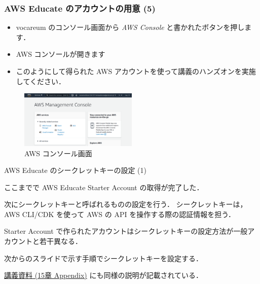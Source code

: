 \documentclass[unicode,11pt]{beamer}
\begin{document}
\begin{frame}
\frametitle{AWS Educate のアカウントの用意 (5)}

\begin{itemize}
    \item vocareum のコンソール画面から \emph{AWS Console} と書かれたボタンを押します．
    \item AWS コンソールが開きます
    \item このようにして得られた AWS アカウントを使って講義のハンズオンを実施してください．
\end{itemize}

\begin{figure}
    \centering
    \includegraphics[width=0.5\textwidth]{imgs/aws_console_screenshot.png}
    \caption{AWS コンソール画面}
\end{figure}

\end{frame}

\begin{frame}{AWS Educate のシークレットキーの設定 (1)}

ここまでで AWS Educate Starter Account の取得が完了した．

次にシークレットキーと呼ばれるものの設定を行う．
シークレットキーは， AWS CLI/CDK を使って AWS の API を操作する際の認証情報を担う．

Starter Account で作られたアカウントはシークレットキーの設定方法が一般アカウントと若干異なる．

次からのスライドで示す手順でシークレットキーを設定する．

\href{https://tomomano.github.io/learn-aws-by-coding/}{講義資料 (15章 Appendix)} にも同様の説明が記載されている．
    
\end{frame}
\end{document}

